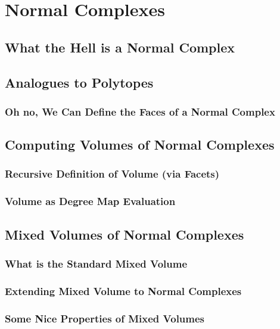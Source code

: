 \documentclass[12pt,oneside]{../../sfsuthesis}
\begin{document}
\chapter{Normal Complexes}

\section{What the Hell is a Normal Complex}


\section{Analogues to Polytopes}

\subsection{Oh no, We Can Define the Faces of a Normal Complex}

\section{Computing Volumes of Normal Complexes}

\subsection{Recursive Definition of Volume (via Facets)}

\subsection{Volume as Degree Map Evaluation}

\section{Mixed Volumes of Normal Complexes}

\subsection{What is the Standard Mixed Volume}

\subsection{Extending Mixed Volume to Normal Complexes}

\subsection{Some Nice Properties of Mixed Volumes}
\end{document}
